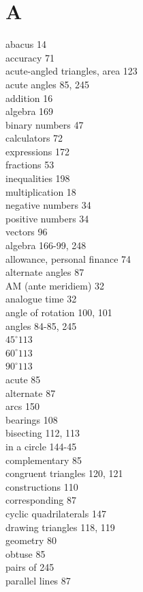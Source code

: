 \documentclass[10pt]{article}
\begin{document}
\section*{A}
abacus 14\\
accuracy 71\\
acute-angled triangles, area 123\\
acute angles 85, 245\\
addition 16\\
algebra 169\\
binary numbers 47\\
calculators 72\\
expressions 172\\
fractions 53\\
inequalities 198\\
multiplication 18\\
negative numbers 34\\
positive numbers 34\\
vectors 96\\
algebra 166-99, 248\\
allowance, personal finance 74\\
alternate angles 87\\
AM (ante meridiem) 32\\
analogue time 32\\
angle of rotation 100, 101\\
angles 84-85, 245\\
$45^{\circ} 113$\\
$60^{\circ} 113$\\
$90^{\circ} 113$\\
acute 85\\
alternate 87\\
arcs 150\\
bearings 108\\
bisecting 112, 113\\
in a circle 144-45\\
complementary 85\\
congruent triangles 120, 121\\
constructions 110\\
corresponding 87\\
cyclic quadrilaterals 147\\
drawing triangles 118, 119\\
geometry 80\\
obtuse 85\\
pairs of 245\\
parallel lines 87\\
\end{document}
